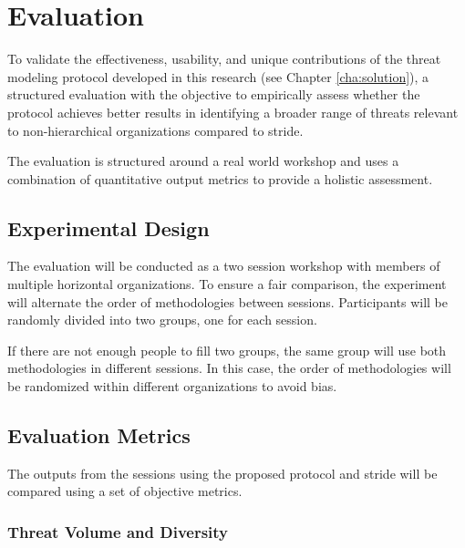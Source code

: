 
%

\chapter{Evaluation}
\label{cha:evaluation}

\glsresetall

To validate the effectiveness, usability, and unique contributions of the threat
modeling protocol developed in this research (see Chapter \ref{cha:solution}), a
structured evaluation with the objective to empirically assess whether the protocol
achieves better results in identifying a broader range of threats relevant to
non-hierarchical organizations compared to \gls{stride}.

The evaluation is structured around a real world workshop and uses a
combination of quantitative output metrics to provide a holistic assessment.

\section{Experimental Design}
\label{sec:experimental_design}

The evaluation will be conducted as a two session workshop with members
of multiple horizontal organizations. To ensure a fair comparison, the
experiment will alternate the order of methodologies between sessions. Participants
will be randomly divided into two groups, one for each session.

If there are not enough people to fill two groups, the same group
will use both methodologies in different sessions. In this case, the
order of methodologies will be randomized within different
organizations to avoid bias.

\section{Evaluation Metrics}
\label{sec:evaluation_metrics}

The outputs from the sessions using the proposed protocol and \gls{stride} will be
compared using a set of objective metrics.

\subsection{Threat Volume and Diversity}
\label{subsec:threat_volume_and_diversity}

